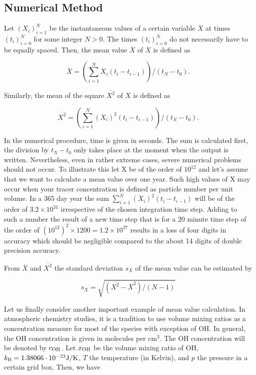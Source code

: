 \begin{appendix}
\subsection{Numerical Method}
Let $(X_i)_{i=1}^N$ be the instantaneous values of a certain variable
$X$ at times $(t_i)_{i=0}^N$ for some integer $N>0$. The times 
$(t_i)_{i=0}^N$ do not necessarily have to be equally spaced. Then, the mean
value $\overline{X}$ of $X$ is defined as

\begin{equation}\label{eq1}
\overline{X}=\left(\sum\limits_{i=1}^N X_i (t_i-t_{i-1})\right)/(t_N-t_0).
\end{equation}

Similarly, the mean of the square $\overline{X^2}$ of $X$ is defined as

\begin{equation}\label{eq2}
\overline{X^2}=\left(\sum\limits_{i=1}^N (X_i)^2 (t_i-t_{i-1})\right)
/(t_N-t_0).
\end{equation}

In the numerical procedure, time is given in seconds. The sum is calculated
first, the division by $t_N-t_0$ only takes place at the moment when the
output is written. Nevertheless, even in rather extreme cases, severe
numerical problems should 
not occur. To illustrate this
let X be of the order of 
$10^{12}$ and let's assume that we want to 
calculate a mean value over one year.
Such high values of X may occur when your tracer concentration is defined
as particle number per unit volume. In a 365 day year
the sum $\sum\limits_{i=1}^N (X_i)^2 (t_i-t_{i-1})$
will be of the order of $3.2\times10^{31}$ irrespective of 
the chosen integration
time step. Adding to such a number the result of a new time step that
is for a 20 minute time step of the order of $(10^{12})^2\times
1200=1.2\times 10^{27}$ results in a loss of four digits in accuracy which should
be negligible compared to the about 14 digits of double precision accuracy.

From $\overline{X}$ and $\overline{X^2}$ the standard deviation $s_X$ of the
mean value can be estimated by

\begin{equation}\label{eq3}
s_X=\sqrt{(\overline{X^2}-\overline{X}^2)/(N-1)}
\end{equation} 

Let us finally consider another important example of mean value calculation.
In atmospheric chemistry studies, it is a tradition to use volume mixing 
ratios as a concentration measure for most of the species with exception of
OH. In general, the OH concentration is given in molecules per cm$^3$.
The OH concentration will be denoted by $c_{\rm OH}$.
Let $x_{\rm OH}$ be the volume mixing ratio of OH, 
$k_{\rm B}=1.38066\cdot 10^{-23}{\rm J/K}$, $T$ the temperature (in Kelvin),
and $p$ the pressure in a certain grid box. Then, we have


\end{appendix}
